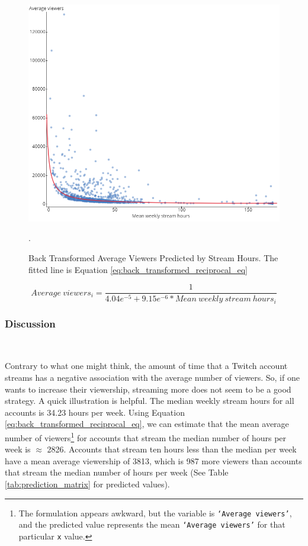 \documentclass[12pt]{article}
\begin{document}
\begin{figure}[H]
  \centering %
  \includegraphics[width=0.8\linewidth]{../StatCrunch_Results/reciprocal/scatter_plot_reverse_transformed}
  \captionsetup{justification=centering, singlelinecheck=false, margin=2cm}
  \caption[Back Transformed Average Viewers Predicted by Stream Hours]{Back Transformed Average Viewers Predicted by Stream Hours. The fitted line is Equation \ref{eq:back_transformed_reciprocal_eq}}.
  \label{fig:transformed_reciprocal_scatter}
\end{figure}

\begin{equation}
Average\ viewers_{i} = \dfrac{1}{4.04e^{-5} + 9.15e^{-6} \ast Mean\ weekly\ stream\ hours_{i}} \label{eq:back_transformed_reciprocal_eq}
\end{equation}

\subsubsection{Discussion}\

Contrary to what one might think, the amount of time that a Twitch account streams has a negative association with the average number of viewers. So, if one wants to increase their viewership, streaming more does not seem to be a good strategy. A quick illustration is helpful. The median weekly stream hours for all accounts is 34.23 hours per week. Using Equation \ref{eq:back_transformed_reciprocal_eq}, we can estimate that the mean average number of viewers\footnote{The formulation appears awkward, but the variable is \texttt{`Average viewers'}, and the predicted value represents the mean \texttt{`Average viewers'} for that particular \texttt{x} value.} for accounts that stream the median number of hours per week is $\approx$ 2826. Accounts that stream ten hours less than the median per week have a mean average viewership of 3813, which is 987 more viewers than accounts that stream the median number of hours per week (See Table \ref{tab:prediction_matrix} for predicted values). 
\end{document}
